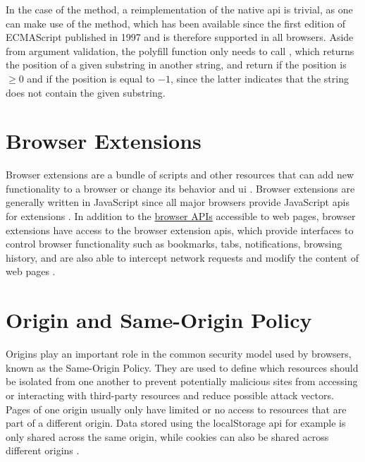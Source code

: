 In the case of the  method, a reimplementation of the native \acs{api} is trivial, as one can make use of the  method, which has been available since the first edition of ECMAScript published in 1997 \cite{ECMA262_edition1} and is therefore supported in all browsers. Aside from argument validation, the polyfill function only needs to call , which returns the position of a given substring in another string, and return  if the position is $\ge 0$ and  if the position is equal to $-1$, since the latter indicates that the string does not contain the given substring.



\section{Browser Extensions}
\label{sec.browserExtensions}

Browser extensions are a bundle of scripts and other resources that can add new functionality to a browser or change its behavior and \ac{ui} \cite{MozBrowserExtensions}. Browser extensions are generally written in JavaScript since all major browsers provide JavaScript \acsp{api} for extensions \cite{MozBrowserExtensionAPIs}. In addition to the \hyperref[sec.browserAPIs]{browser APIs} accessible to web pages, browser extensions have access to the browser extension \acsp{api}, which provide interfaces to control browser functionality such as bookmarks, tabs, notifications, browsing history, and are also able to intercept network requests and modify the content of web pages \cite{MozBrowserExtensions}.



\section{Origin and Same-Origin Policy}
\label{sec.origin}

Origins play an important role in the common security model used by browsers, known as the Same-Origin Policy. They are used to define which resources should be isolated from one another to prevent potentially malicious sites from accessing or interacting with third-party resources and reduce possible attack vectors. Pages of one origin usually only have limited or no access to resources that are part of a different origin. Data stored using the localStorage \acs{api} for example is only shared across the same origin, while cookies can also be shared across different origins \cite{html}. \cite{MozSameOriginPolicy}

